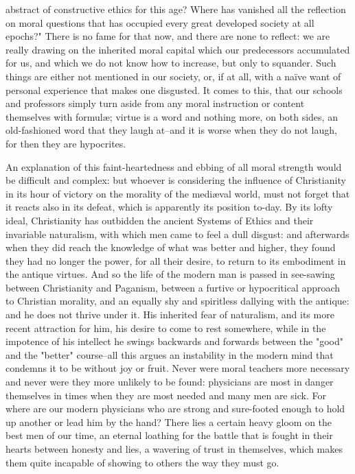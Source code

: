 abstract of constructive ethics for this age? Where has vanished all
the reflection on moral questions that has occupied every great
developed society at all epochs?" There is no fame for that now, and
there are none to reflect: we are really drawing on the inherited
moral capital which our predecessors accumulated for us, and which we
do not know how to increase, but only to squander. Such things are
either not mentioned in our society, or, if at all, with a naïve want
of personal experience that makes one disgusted. It comes to this,
that our schools and professors simply turn aside from any moral
instruction or content themselves with formulæ; virtue is a word and
nothing more, on both sides, an old-fashioned word that they laugh
at--and it is worse when they do not laugh, for then they are
hypocrites.

An explanation of this faint-heartedness and ebbing of all moral
strength would be difficult and complex: but whoever is considering
the influence of Christianity in its hour of victory on the morality
of the mediæval world, must not forget that it reacts also in its
defeat, which is apparently its position to-day. By its lofty ideal,
Christianity has outbidden the ancient Systems of Ethics and their
invariable naturalism, with which men came to feel a dull disgust:
and afterwards when they did reach the knowledge of what was better
and higher, they found they had no longer the power, for all their
desire, to return to its embodiment in the antique virtues. And so
the life of the modern man is passed in see-sawing between
Christianity and Paganism, between a furtive or hypocritical approach
to Christian morality, and an equally shy and spiritless dallying
with the antique: and he does not thrive under it. His inherited fear
of naturalism, and its more recent attraction for him, his desire to
come to rest somewhere, while in the impotence of his intellect he
swings backwards and forwards between the "good" and the "better"
course--all this argues an instability in the modern mind that
condemns it to be without joy or fruit. Never were moral teachers
more necessary and never were they more unlikely to be found:
physicians are most in danger themselves in times when they are most
needed and many men are sick. For where are our modern physicians who
are strong and sure-footed enough to hold up another or lead him by
the hand? There lies a certain heavy gloom on the best men of our
time, an eternal loathing for the battle that is fought in their
hearts between honesty and lies, a wavering of trust in themselves,
which makes them quite incapable of showing to others the way they
must go.

